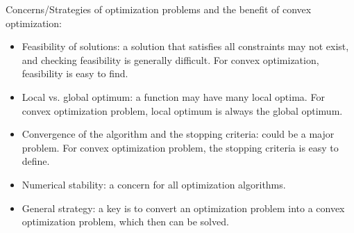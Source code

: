 \documentclass{report}
\begin{document}
Concerns/Strategies of optimization problems and the benefit of convex optimization: 
\begin{itemize}
\item Feasibility of solutions: a solution that satisfies all constraints may not exist, and checking feasibility is generally difficult. For convex optimization, feasibility is easy to find. 

\item Local vs. global optimum: a function may have many local optima. For convex optimization problem, local optimum is always the global optimum. 

\item Convergence of the algorithm and the stopping criteria: could be a major problem. For convex optimization problem, the stopping criteria is easy to define. 

\item Numerical stability: a concern for all optimization algorithms. 

\item General strategy: a key is to convert an optimization problem into a convex optimization problem, which then can be solved. 
\end{itemize}
\end{document}
